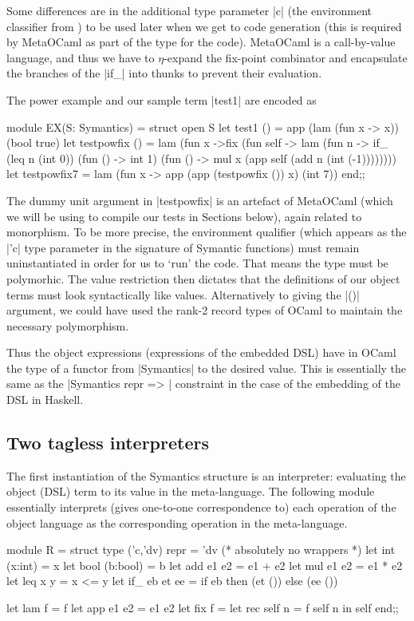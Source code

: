 \documentclass[preprint]{sigplanconf}
\let\cite=\citep
\begin{document}
Some differences are in the additional type parameter |c| (the
environment classifier from \cite{WalidPOPL03}) to be used later when we get to
code generation (this is required by MetaOCaml as part of the type for the
code). MetaOCaml is a call-by-value language, and thus we have to 
$\eta$-expand
the fix-point combinator and encapsulate the branches of the |if_|
into thunks to prevent their evaluation. 

The power example and our sample term |test1| are encoded as
\begin{code}
module EX(S: Symantics) = struct
 open S
 let test1 () = app (lam (fun x -> x)) (bool true)
 let testpowfix () = 
   lam (fun x ->fix (fun self -> lam (fun n ->
     if_ (leq n (int 0)) (fun () -> int 1)
         (fun () -> mul x (app self 
                               (add n (int (-1))))))))
 let testpowfix7 = 
    lam (fun x -> app (app (testpowfix ()) x) (int 7))
end;;
\end{code}
The dummy unit argument in |testpowfix| is an artefact of MetaOCaml
(which we will be using to compile our tests in Sections below),
again related to monorphism. To be
more precise, the environment qualifier (which appears as the |'c|
type parameter in the signature of Symantic functions) must remain
uninstantiated in order for us to `run' the code. That means the type
must be polymorhic. The value restriction then dictates that
the definitions of our object terms must look syntactically like
values. Alternatively to giving the |()| argument, we could have used
the rank-2 record types of OCaml to maintain the necessary polymorphism.

Thus the object expressions (expressions of the embedded DSL) have in
OCaml the type of a functor from |Symantics| to the desired value. This
is essentially the same as the |Symantics repr => | constraint in the case of
the embedding of the DSL in Haskell.

\subsection{Two tagless interpreters}
The first instantiation of the Symantics structure is an interpreter:
evaluating the object (DSL) term to its value in the meta-language. 
The following module essentially interprets (gives one-to-one
correspondence to) each operation of the object language as the
corresponding operation in the meta-language.
\begin{code}
module R  = struct
  type ('c,'dv) repr = 'dv (* absolutely no wrappers *)
  let int  (x:int)  = x
  let bool (b:bool) = b
  let add  e1 e2    = e1 + e2
  let mul  e1 e2    = e1 * e2
  let leq  x y      = x <= y
  let if_  eb et ee = if eb then (et ()) else (ee ())

  let lam f         = f
  let app e1 e2     = e1 e2
  let fix f         = let rec self n = f self n in self
end;;
\end{code}
\end{document}
